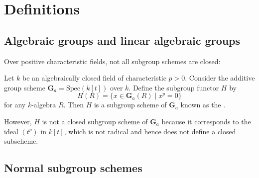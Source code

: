 
\section{Definitions}

\subsection{Algebraic groups and linear algebraic groups}








Over positive characteristic fields, not all subgroup schemes are closed:

\begin{example}
Let $k$ be an algebraically closed field of characteristic $p > 0$. Consider the additive group scheme $\mathbf{G}_a = \mathrm{Spec}(k[t])$ over $k$. Define the subgroup functor $H$ by
$$ H(R) = \{ x \in \mathbf{G}_a(R) \mid x^{p} = 0 \} $$
for any $k$-algebra $R$. Then $H$ is a subgroup scheme of $\mathbf{G}_a$ known as the .

However, $H$ is not a closed subgroup scheme of $\mathbf{G}_a$ because it corresponds to the ideal $(t^p)$ in $k[t]$, which is not radical and hence does not define a closed subscheme.
\end{example}








\subsection{Normal subgroup schemes}

